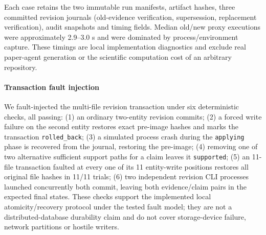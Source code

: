 \documentclass[journal]{IEEEtran}
\begin{document}
Each case retains the two immutable run manifests, artifact hashes, three committed revision journals (old-evidence verification, supersession, replacement verification), audit snapshots and timing fields. Median old/new proxy executions were approximately 2.9--3.0 s and were dominated by process/environment capture. These timings are local implementation diagnostics and exclude real paper-agent generation or the scientific computation cost of an arbitrary repository.

\paragraph{Transaction fault injection} We fault-injected the multi-file revision transaction under six deterministic checks, all passing: (1) an ordinary two-entity revision commits; (2) a forced write failure on the second entity restores exact pre-image hashes and marks the transaction \texttt{rolled\_back}; (3) a simulated process crash during the \texttt{applying} phase is recovered from the journal, restoring the pre-image; (4) removing one of two alternative sufficient support paths for a claim leaves it \texttt{supported}; (5) an 11-file transaction faulted at every one of its 11 entity-write positions restores all original file hashes in 11/11 trials; (6) two independent revision CLI processes launched concurrently both commit, leaving both evidence/claim pairs in the expected final states. These checks support the implemented local atomicity/recovery protocol under the tested fault model; they are not a distributed-database durability claim and do not cover storage-device failure, network partitions or hostile writers.
\end{document}
